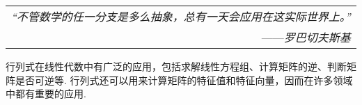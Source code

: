 \begin{flushright}
    \begin{tabular}{r||}
        \textit{“不管数学的任一分支是多么抽象，总有一天会应用在这实际世界上。”}\\
        ——\textit{罗巴切夫斯基}
    \end{tabular}
\end{flushright}

行列式在线性代数中有广泛的应用，包括求解线性方程组、计算矩阵的逆、判断矩阵是否可逆等. 行列式还可以用来计算矩阵的特征值和特征向量，因而在许多领域中都有重要的应用. 